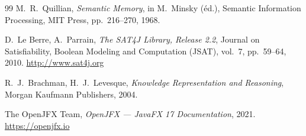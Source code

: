 \begin{thebibliography}{99}
  M.~R.~Quillian,
  \textit{Semantic Memory},
  in M.~Minsky (éd.), Semantic Information Processing,
  MIT Press, pp.~216--270, 1968.

  D.~Le Berre, A.~Parrain,
  \textit{The SAT4J Library, Release 2.2},
  Journal on Satisfiability, Boolean Modeling and Computation (JSAT),
  vol.~7, pp.~59--64, 2010.
  \url{http://www.sat4j.org}

  R.~J.~Brachman, H.~J.~Levesque,
  \textit{Knowledge Representation and Reasoning},
  Morgan Kaufmann Publishers, 2004.

  The OpenJFX Team,
  \textit{OpenJFX — JavaFX 17 Documentation},
  2021.
  \url{https://openjfx.io}

\end{thebibliography}
